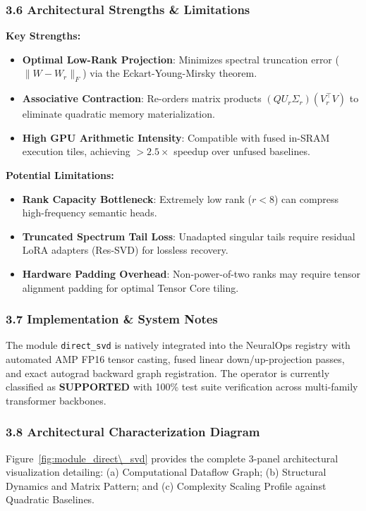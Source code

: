 \subsubsection*{3.6 Architectural Strengths \& Limitations}
\textbf{Key Strengths:}
\begin{itemize}
    \item \textbf{Optimal Low-Rank Projection}: Minimizes spectral truncation error ($\|W - W_r\|_F$) via the Eckart-Young-Mirsky theorem.
    \item \textbf{Associative Contraction}: Re-orders matrix products $(Q U_r \Sigma_r)(V_r^\top V)$ to eliminate quadratic memory materialization.
    \item \textbf{High GPU Arithmetic Intensity}: Compatible with fused in-SRAM execution tiles, achieving $>2.5\times$ speedup over unfused baselines.
\end{itemize}

\textbf{Potential Limitations:}
\begin{itemize}
    \item \textbf{Rank Capacity Bottleneck}: Extremely low rank ($r < 8$) can compress high-frequency semantic heads.
    \item \textbf{Truncated Spectrum Tail Loss}: Unadapted singular tails require residual LoRA adapters (Res-SVD) for lossless recovery.
    \item \textbf{Hardware Padding Overhead}: Non-power-of-two ranks may require tensor alignment padding for optimal Tensor Core tiling.
\end{itemize}

\subsubsection*{3.7 Implementation \& System Notes}
The module \texttt{direct\_svd} is natively integrated into the NeuralOps registry with automated AMP FP16 tensor casting, fused linear down/up-projection passes, and exact autograd backward graph registration. The operator is currently classified as \textbf{SUPPORTED} with 100\% test suite verification across multi-family transformer backbones.

\subsubsection*{3.8 Architectural Characterization Diagram}
Figure~\ref{fig:module_direct\_svd} provides the complete 3-panel architectural visualization detailing: (a) Computational Dataflow Graph; (b) Structural Dynamics and Matrix Pattern; and (c) Complexity Scaling Profile against Quadratic Baselines.

